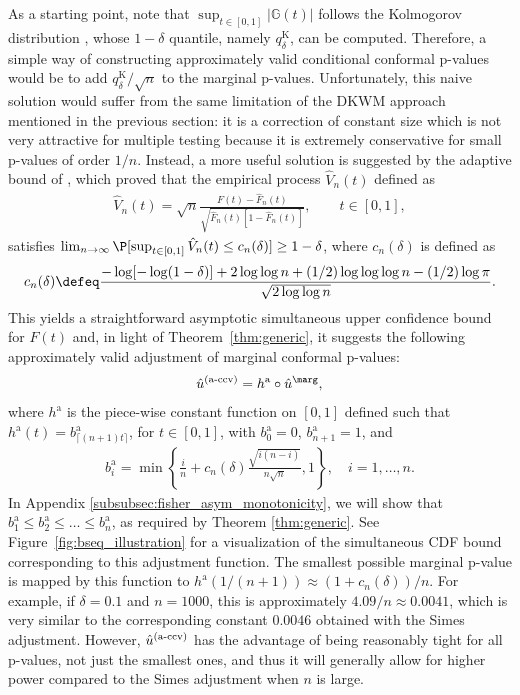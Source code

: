 As a starting point, note that $\sup_{t \in [0,1]}|\mathbb{G}(t)|$ follows the Kolmogorov distribution \cite{kolmogorov1933sulla}, whose $1-\delta$ quantile, namely $q^{\text{K}}_{\delta}$, can be computed. Therefore, a simple way of constructing approximately valid conditional conformal p-values would be to add $q^{\text{K}}_{\delta} / \sqrt{n}$ to the marginal p-values. Unfortunately, this naive solution would suffer from the same limitation of the DKWM approach mentioned in the previous section: it is a correction of constant size which is not very attractive for multiple testing because it is extremely conservative for small p-values of order $1/n$.
Instead, a more useful solution is suggested by the adaptive bound of \cite{eicker1979asymptotic}, which proved that the empirical process $\hat{V}_n(t)$ defined as
\begin{align*}
\hat{V}_n(t) = \sqrt{n} \frac{F(t) - \hat{F}_n(t)}{ \sqrt{\hat{F}_n(t)[1 - \hat{F}_n(t)]}}, \qquad t \in [0,1],
\end{align*}
satisfies $\lim_{n \to \infty} \P[ \sup_{t \in [0, 1]}\hat{V}_n(t) \leq c_n(\delta) ] \geq 1-\delta$,
where $c_n(\delta)$ is defined as
\begin{align*}
c_n(\delta) \defeq \frac{-\log[-\log(1-\delta)]+2\log\log n + (1/2) \log \log \log n - (1/2) \log\pi }{\sqrt{2 \log \log n}}.
\end{align*}
This yields a straightforward asymptotic simultaneous upper confidence bound for $F(t)$ and, in light of Theorem~\ref{thm:generic}, it suggests the following approximately valid adjustment of marginal conformal p-values:
\begin{align} \label{eq:a-ccv}
\hat{u}^{\textnormal{(a-ccv)}} = h^{\mathrm{a}}\circ \hat{u}^\marg,
\end{align}
where $h^{\mathrm{a}}$ is the piece-wise constant function on $[0,1]$ defined such that $h^{\mathrm{a}}(t) = b^{\mathrm{a}}_{\lceil (n + 1)t\rceil}$, for $t\in [0, 1]$, with $b^{\mathrm{a}}_0=0$, $b^{\mathrm{a}}_{n+1}=1$, and
\begin{align} \label{eq:a-sequence}
b^{\mathrm{a}}_i = \min\left\{\frac{i}{n} + c_n(\delta) \frac{\sqrt{i(n-i)}}{n \sqrt{n}}, 1\right\},
\quad i = 1,\ldots,n.
\end{align}
In Appendix \ref{subsubsec:fisher_asym_monotonicity}, we will show that $b_1^{\mathrm{a}} \le b_2^{\mathrm{a}}\le \ldots \le b_n^{\mathrm{a}}$, as required by Theorem \ref{thm:generic}. See Figure~\ref{fig:bseq_illustration} for a visualization of the simultaneous CDF bound corresponding to this adjustment function.
The smallest possible marginal p-value is mapped by this function to $h^{\mathrm{a}}(1 / (n + 1)) \approx (1+c_n(\delta))/n$. For example, if $\delta = 0.1$ and $n=1000$, this is approximately $4.09/n \approx 0.0041$, which is very similar to the corresponding constant $0.0046$ obtained with the Simes adjustment.
However, $\hat{u}^{\textnormal{(a-ccv)}}$ has the advantage of being reasonably tight for all p-values, not just the smallest ones, and thus it will generally allow for higher power compared to the Simes adjustment when $n$ is large.


